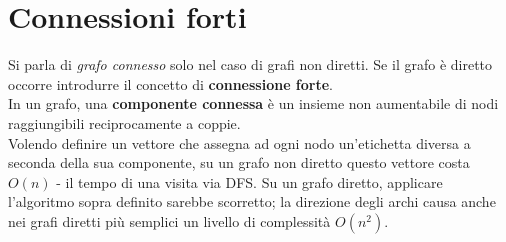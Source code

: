 \section{Connessioni forti}
Si parla di \textit{grafo connesso} solo nel caso di grafi non diretti. Se il grafo è diretto occorre introdurre il concetto di \textbf{connessione forte}. \\
In un grafo, una \textbf{componente connessa} è un insieme non aumentabile di nodi raggiungibili reciprocamente a coppie. \\
Volendo definire un vettore che assegna ad ogni nodo un'etichetta diversa a seconda della sua componente, su un grafo non diretto questo vettore costa $ O(n) $ - il tempo di una visita via DFS.
Su un grafo diretto, applicare l'algoritmo sopra definito sarebbe scorretto; la direzione degli archi causa anche nei grafi diretti più semplici un livello di complessità $ O(n^2) $.